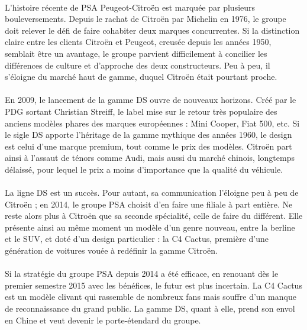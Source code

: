 \documentclass[12pt]{article}\usepackage[]{graphicx}\usepackage[]{color}
\begin{document}
\paragraph{} L'histoire récente de PSA Peugeot-Citroën est marquée par
plusieurs bouleversements. Depuis le rachat de Citroën par Michelin en 1976, le
groupe doit relever le défi de faire cohabiter deux marques concurrentes. Si la
distinction claire entre les clients Citroën et Peugeot, creusée depuis les
années 1950, semblait être un avantage, le groupe parvient difficilement à
concilier les différences de culture et d'approche des deux constructeurs. Peu
à peu, il s'éloigne du marché haut de gamme, duquel Citroën était pourtant
proche.

\paragraph{} En 2009, le lancement de la gamme DS ouvre de nouveaux horizons.
Créé par le PDG sortant Christian Streiff, le label mise sur le retour très
populaire des anciens modèles phares des marques européennes : Mini Cooper,
Fiat 500, etc. Si le sigle DS apporte l'héritage de la gamme mythique des
années 1960, le design est celui d'une marque premium, tout comme le prix des
modèles. Citroën part ainsi à l'assaut de ténors comme Audi, mais aussi du
marché chinois, longtemps délaissé, pour lequel le prix a moins d'importance
que la qualité du véhicule.

\paragraph{} La ligne DS est un succès. Pour autant, sa communication l'éloigne
peu à peu de Citroën ; en 2014, le groupe PSA choisit d'en faire une filiale à part
entière. Ne reste alors plus à Citroën que sa seconde spécialité, celle de
faire du différent. Elle présente ainsi au même moment un modèle d'un genre
nouveau, entre la berline et le SUV, et doté d'un design particulier : la C4
Cactus, première d'une génération de voitures vouée à redéfinir la gamme
Citroën.

\paragraph{} Si la stratégie du groupe PSA depuis 2014 a été efficace, en
renouant dès le premier semestre 2015 avec les bénéfices\cite{lesechos}, le
futur est plus incertain. La C4 Cactus est un modèle clivant qui rassemble de
nombreux fans mais souffre d'un manque de reconnaissance du grand public. La
gamme DS, quant à elle, prend son envol en Chine et veut devenir le porte-étendard
du groupe.\\
\end{document}
